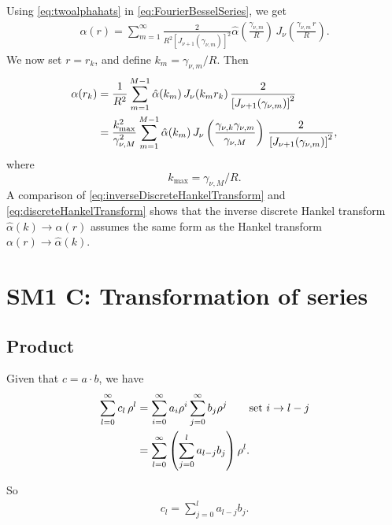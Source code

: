 \documentclass[preprint]{revtex4-1}
\numberwithin{equation}{subsection}
\numberwithin{table}{section}
\begin{document}
Using \eqref{eq:twoalphahats} in \eqref{eq:FourierBesselSeries},
we get
\begin{align*}
  \alpha(r)
=
\sum_{m = 1}^\infty
\frac{ 2 } { R^2 [J_{\nu + 1}(\gamma_{\nu, m})]^2 }
\hat\alpha
  \left(
    \frac{ \gamma_{\nu, m} } { R }
  \right) \,
J_\nu\left(
    \frac{ \gamma_{\nu, m} \, r } { R }
  \right).
\end{align*}
%
We now set $r = r_k$, and define $k_m = \gamma_{\nu, m}/R$.
Then
\begin{align}
  \alpha(r_k)
&=
  \frac{ 1 }{ R^2 }
  \sum_{m = 1}^{M - 1}
    \hat\alpha(k_m) \,
    J_\nu(k_m r_k) \,
    \frac{ 2 }
    { \left[
        J_{\nu+1}(\gamma_{\nu,m})
      \right]^2 }
\notag
\\
&=
  \frac{ k_{\max}^2 }
       { \gamma_{\nu, M}^2 }
  \sum_{m = 1}^{M - 1}
    \hat\alpha(k_m) \,
    J_\nu\left(
      \frac{ \gamma_{\nu, k} \gamma_{\nu, m} }
           { \gamma_{\nu, M} }
    \right) \,
    \frac{ 2 }
    { \left[
        J_{\nu + 1}(\gamma_{\nu, m})
      \right]^2 },
\label{eq:inverseDiscreteHankelTransform}
\end{align}
where
\[
  k_{\max} = \gamma_{\nu, M} / R.
\]
A comparison of \eqref{eq:inverseDiscreteHankelTransform}
and \eqref{eq:discreteHankelTransform}
shows that the inverse discrete Hankel transform
$\hat\alpha(k) \rightarrow \alpha(r)$
assumes the same form as the Hankel transform
$\alpha(r) \rightarrow \hat\alpha(k)$.



\section{SM1 C: Transformation of series}

\subsection{Product}

Given that $c = a \cdot b$, we have
\begin{align*}
  \sum_{l = 0}^{\infty} c_l \, \rho^l
  &=
  \sum_{i = 0}^{\infty} a_i \rho^i
  \sum_{j = 0}^{\infty} b_j \rho^j
  \qquad \mbox{set $i \rightarrow l - j$}
 \notag \\
  &=
  \sum_{l = 0}^{\infty}
  \left(
  \sum_{j = 0}^{l}
    a_{l-j} b_j \right) \rho^l.
\end{align*}

So
\begin{align}
  c_l = \sum_{j = 0}^{l} a_{l-j} b_j.
  \label{eq:product}
\end{align}
\end{document}
